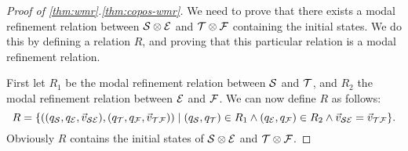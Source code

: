 \begin{proof}[Proof of \ref{thm:wmr}.\ref{thm:copos-wmr}]
    We need to prove that there exists a modal refinement relation between $\S \compos \E $ and $ \T \compos \F$ containing the initial states. We do this by defining a relation $R$, and proving that this particular relation is a modal refinement relation.

    First let $R_1$ be the modal refinement relation between $\S$ and $\T$, and $R_2$ the modal refinement relation between $\E$ and $\F$. We can now define $R$ as follows:
    \[
        R = \{ ((q_\S,q_\E, \vec{v}_{\S\E}),(q_\T,q_\F, \vec{v}_{\T\F})) \mid (q_\S, q_\T) \in R_1 \wedge (q_\E, q_\F) \in R_2 \wedge \vec{v}_{\S\E} = \vec{v}_{\T\F} \}.
    \]
    Obviously $R$ contains the initial states of $\S \compos \E$ and $\T \compos \F$.


\end{proof}
